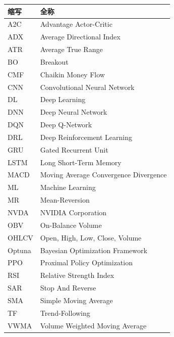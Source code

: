 \begin{tabular}{ll}
\toprule
缩写 & 全称 \\
\midrule
A2C & Advantage Actor-Critic \\
ADX & Average Directional Index \\
ATR & Average True Range \\
BO & Breakout \\
CMF & Chaikin Money Flow \\
CNN & Convolutional Neural Network \\
DL & Deep Learning \\
DNN & Deep Neural Network \\
DQN & Deep Q-Network \\
DRL & Deep Reinforcement Learning \\
GRU & Gated Recurrent Unit \\
LSTM & Long Short-Term Memory \\
MACD & Moving Average Convergence Divergence \\
ML & Machine Learning \\
MR & Mean-Reversion \\
NVDA & NVIDIA Corporation \\
OBV & On-Balance Volume \\
OHLCV & Open, High, Low, Close, Volume \\
Optuna & Bayesian Optimization Framework \\
PPO & Proximal Policy Optimization \\
RSI & Relative Strength Index \\
SAR & Stop And Reverse \\
SMA & Simple Moving Average \\
TF & Trend-Following \\
VWMA & Volume Weighted Moving Average \\
\bottomrule
\end{tabular}

